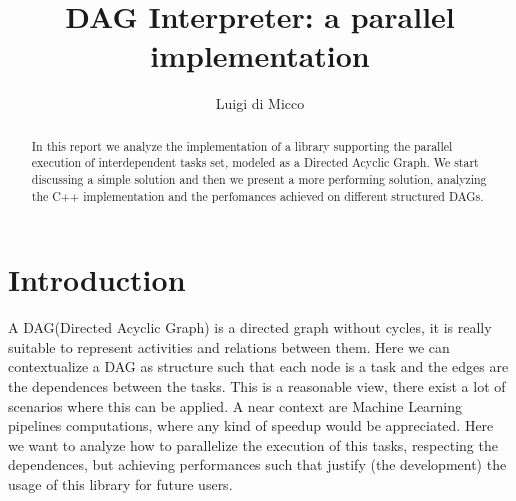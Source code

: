 \documentclass[a4paper,11pt]{article}
\title{DAG Interpreter: a parallel implementation}
\author{Luigi di Micco}
\begin{document}
\maketitle

\begin{abstract}
In this report we analyze the implementation of a library supporting the parallel execution of interdependent tasks set, modeled as a Directed Acyclic Graph.
We start discussing a simple solution and then we present a more performing solution, analyzing the C++ implementation and the perfomances achieved on different structured DAGs.   
\end{abstract}

\section{Introduction}
A DAG(Directed Acyclic Graph) is a directed graph without cycles, it is really suitable to represent activities and relations between them.
Here we can contextualize a DAG as structure such that each node is a task and the edges are the dependences between the tasks.
This is a reasonable view, there exist a lot of scenarios where this can be applied. A near context are Machine Learning pipelines computations, 
where any kind of speedup would be appreciated.
Here we want to analyze how to parallelize the execution of this tasks, respecting the dependences, but achieving performances such that justify (the development) the usage of this library for future users.
\end{document}

